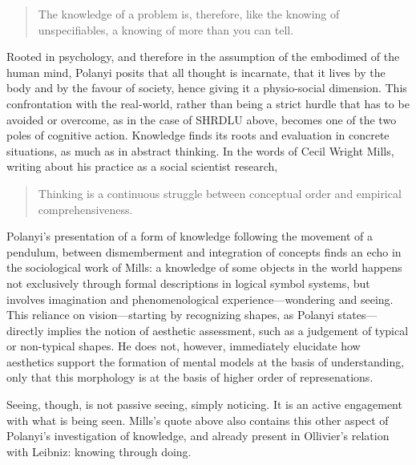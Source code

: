 \begin{quote}
    The knowledge of a problem is, therefore, like the knowing of unspecifiables, a knowing of more than you can tell. \citep{polanyi_knowing_1969}
\end{quote}

Rooted in psychology, and therefore in the assumption of the embodimed of the human mind, Polanyi posits that all thought is incarnate, that it lives by the body and by the favour of society, hence giving it a physio-social dimension. This confrontation with the real-world, rather than being a strict hurdle that has to be avoided or overcome, as in the case of SHRDLU above, becomes one of the two poles of cognitive action. Knowledge finds its roots and evaluation in concrete situations, as much as in abstract thinking. In the words of Cecil Wright Mills, writing about his practice as a social scientist research,

\begin{quote}
    Thinking is a continuous struggle between conceptual order and empirical comprehensiveness. \citep{MillsC.WrightCharlesWright2000Tsi}
\end{quote}

Polanyi's presentation of a form of knowledge following the movement of a pendulum, between dismemberment and integration of concepts finds an echo in the sociological work of Mills: a knowledge of some objects in the world happens not exclusively through formal descriptions in logical symbol systems, but involves imagination and phenomenological experience—wondering and seeing. This reliance on vision—starting by recognizing shapes, as Polanyi states—directly implies the notion of aesthetic assessment, such as a judgement of typical or non-typical shapes. He does not, however, immediately elucidate how aesthetics support the formation of mental models at the basis of understanding, only that this morphology is at the basis of higher order of represenations.

Seeing, though, is not passive seeing, simply noticing. It is an active engagement with what is being seen. Mills's quote above also contains this other aspect of Polanyi's investigation of knowledge, and already present in Ollivier's relation with Leibniz: knowing through doing.

